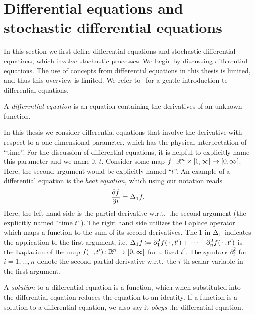 \section{Differential equations and stochastic differential equations}
\label{sec:pdes}
In this section we first define differential equations and stochastic differential equations, which involve stochastic processes.
We begin by discussing differential equations.
The use of concepts from differential equations in this thesis is limited, and thus this overview is limited.
We refer to~\cite{Zill2023-sp} for a gentle introduction to differential equations.
\begin{definition}%
	\label{def:differential equation}
	A \emph{differential equation} is an equation containing the derivatives of an unknown function.
\end{definition}
In this thesis we consider differential equations that involve the derivative with respect to a one-dimensional parameter, which has the physical interpretation of \enquote{time}.
For the discussion of differential equations, it is helpful to explicitly name this parameter and we name it \( t \).
Consider some map \( \map{f}{\R^n \times \rinterval{\num{0}}{\infty}}{\rinterval{\num{0}}{\infty}} \).
Here, the second argument would be explicitly named \enquote{\( t \)}.
An example of a differential equation is the \emph{heat equation}, which using our notation reads
\begin{equation}
	\frac{\partial f}{\partial t} = \Delta_{\num{1}} f.
\end{equation}
Here, the left hand side is the partial derivative w.r.t.\ the second argument (the explicitly named \enquote{time \( t \)}).
The right hand side utilizes the Laplace operator which maps a function to the sum of its second derivatives.
The \( \num{1} \) in \( \Delta_{\num{1}} \) indicates the application to the first argument, i.e. \( \Delta_{\num{1}} f \coloneqq \partial^{\num{2}}_{\num{1}} f(\,\cdot\,, t^\prime) + \cdots + \partial^{\num{2}}_n f(\,\cdot\,, t^\prime) \) is the Laplacian of the map \( \map{f(\argm,t^\prime)}{\R^n}{\rinterval{\num{0}}{\infty}} \) for a fixed \( t^\prime \).
The symbols \( \partial^{\num{2}}_i \) for \( i = \num{1}, \ldots, n \) denote the second partial derivative w.r.t.\ the \( i \)-th scalar variable in the first argument.
\begin{definition}
	\label{def:solution of a differential equation}
	A \emph{solution} to a differential equation is a function, which when substituted into the differential equation reduces the equation to an identity.
	If a function is a solution to a differential equation, we also say it \emph{obeys} the differential equation.
\end{definition}
